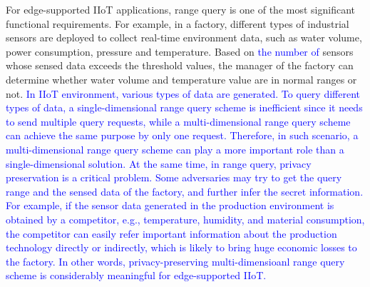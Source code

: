 \documentclass[IEEE JOURNAL OF BIOMEDICAL AND HEALTH INFORMATICS]{IEEEtran}
\begin{document}
For edge-supported IIoT applications, range query is one of the most significant functional requirements. For example, in a factory, different types of industrial sensors are deployed to collect real-time environment data, such as water volume, power consumption, pressure and temperature. Based on \textcolor{blue}{the number of} sensors whose sensed data exceeds the threshold values, the manager of the factory can determine whether water volume and temperature value are in normal ranges or not. \textcolor{blue}{In IIoT environment, various types of data are generated. To query different types of data, a single-dimensional range query scheme is inefficient since it needs to send multiple query requests, while a multi-dimensional range query scheme can achieve the same purpose by only one request. Therefore, in such scenario, a multi-dimensional range query scheme can play a more important role than a single-dimensional solution. At the same time, in range query, privacy preservation \cite{8600750} is a critical problem. Some adversaries may try to get the query range and the sensed data of the factory, and further infer the secret information. For example, if the sensor data generated in the production environment is obtained by a competitor, e.g., temperature, humidity, and material consumption, the competitor can easily refer important information about the production technology directly or indirectly, which is likely to bring huge economic losses to the factory. In other words, privacy-preserving multi-dimensioanl range query scheme is considerably meaningful for edge-supported IIoT.} 
\end{document}
